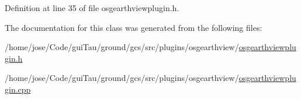 Definition at line 35 of file osgearthviewplugin.\-h.



The documentation for this class was generated from the following files\-:\begin{DoxyCompactItemize}
\item 
/home/jose/\-Code/gui\-Tau/ground/gcs/src/plugins/osgearthview/\hyperlink{osgearthviewplugin_8h}{osgearthviewplugin.\-h}\item 
/home/jose/\-Code/gui\-Tau/ground/gcs/src/plugins/osgearthview/\hyperlink{osgearthviewplugin_8cpp}{osgearthviewplugin.\-cpp}\end{DoxyCompactItemize}

